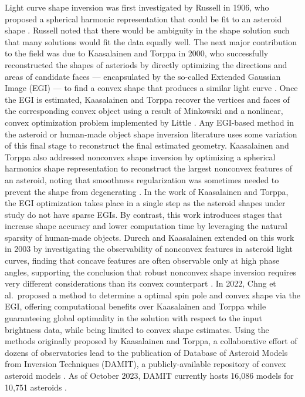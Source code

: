 Light curve shape inversion was first investigated by Russell in 1906, who proposed a spherical harmonic representation that could be fit to an asteroid shape \cite{russell1906}. Russell noted that there would be ambiguity in the shape solution such that many solutions would fit the data equally well. The next major contribution to the field was due to Kaasalainen and Torppa in 2000, who successfully reconstructed the shapes of asteriods by directly optimizing the directions and areas of candidate faces --- encapsulated by the so-called Extended Gaussian Image (EGI) --- to find a convex shape that produces a similar light curve \cite{kaasalainen2000, kaasalainen2001}. Once the EGI is estimated, Kaasalainen and Torppa recover the vertices and faces of the corresponding convex object using a result of Minkowski and a nonlinear, convex optimization problem implemented by Little \cite{minkowski1909, little1983}. Any EGI-based method in the asteroid or human-made object shape inversion literature uses some variation of this final stage to reconstruct the final estimated geometry. Kaasalainen and Torppa also addressed nonconvex shape inversion by optimizing a spherical harmonics shape representation to reconstruct the largest nonconvex features of an asteroid, noting that smoothness regularization was sometimes needed to prevent the shape from degenerating \cite{kaasalainen2000}. In the work of Kaasalainen and Torppa, the EGI optimization takes place in a single step as the asteroid shapes under study do not have sparse EGIs. By contrast, this work introduces stages that increase shape accuracy and lower computation time by leveraging the natural sparsity of human-made objects. Durech and Kaasalainen extended on this work in 2003 by investigating the observability of nonconvex features in asteroid light curves, finding that concave features are often observable only at high phase angles, supporting the conclusion that robust nonconvex shape inversion requires very different considerations than its convex counterpart \cite{durech2003}. In 2022, Chng et al.\ proposed a method to determine a optimal spin pole and convex shape via the EGI, offering computational benefits over Kaasalainen and Torppa while guaranteeing global optimality in the solution with respect to the input brightness data, while being limited to convex shape estimates\cite{chng2022}. Using the methods originally proposed by Kaasalainen and Torppa, a collaborative effort of dozens of observatories lead to the publication of Database of Asteroid Models from Inversion Techniques (DAMIT), a publicly-available repository of convex asteroid models \cite{durech2010}. As of October 2023, DAMIT currently hosts 16,086 models for 10,751 asteroids \cite{damit2014}.

